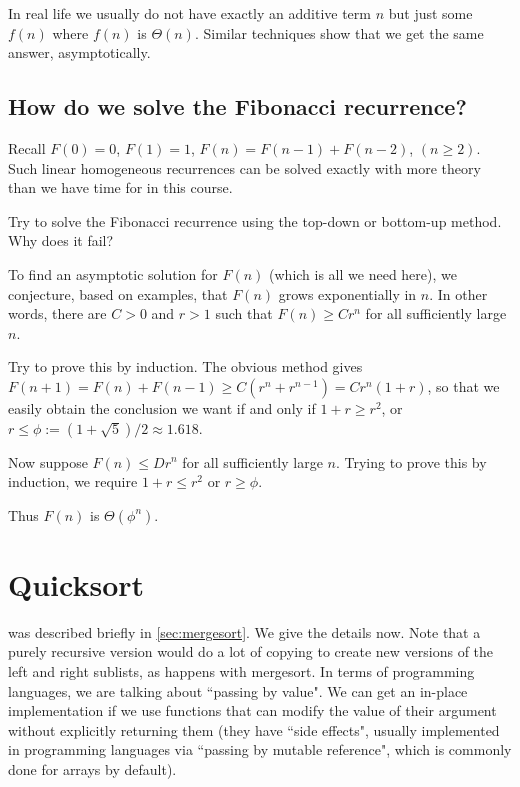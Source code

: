 In real life we usually do not have exactly an additive term $n$
but just some $f(n)$ where $f(n)$ is $\Theta(n)$. Similar techniques show that 
we get the same answer, asymptotically. 


\section{How do we solve the Fibonacci recurrence?}
Recall $F(0) = 0$, $F(1) = 1$, $F(n) = F(n-1) + F(n-2)$,  $(n \geq 2)$.
Such linear homogeneous recurrences can be solved exactly with
more theory than we have time for in this course. 

\begin{Boxample}[3]
Try to solve the Fibonacci recurrence using the top-down or bottom-up method. Why does it fail?

\end{Boxample}

To find an asymptotic solution for $F(n)$ (which is all we need here), we conjecture, based on examples, 
that $F(n)$ grows exponentially in $n$. 
In other words, there are $C > 0$ and $r > 1$ such that 
$F(n) \geq C r^n$ for all sufficiently large $n$.

Try to prove this by induction. The obvious method gives 
$F(n+1) = F(n) + F(n-1) \geq C(r^n + r^{n-1}) = Cr^{n}(1+r)$, so that we easily obtain
the conclusion we want if and only if $1 + r \geq r^2$, or $r \leq
\phi:= (1 + \sqrt{5})/2 \approx 1.618$. 

Now suppose $F(n) \leq D r^n$ for all sufficiently large $n$. 
Trying to prove this by induction, we require $1 + r \leq r^2$ or $r \geq \phi$. 

Thus $F(n)$ is $\Theta(\phi^n)$.


\chapter{Quicksort} %
\label{sec:quicksort}

 was described briefly in \cref{sec:mergesort}. We give the details now. Note that a purely recursive version would do a lot of copying to 
create new versions of the left and right sublists, as happens with mergesort. In terms of programming languages, we are talking about ``passing by value". 
We can get an in-place implementation if we use functions that can modify the value of their argument without explicitly returning them 
(they have ``side effects", usually implemented in programming languages via ``passing by mutable reference", which is commonly done for arrays by default).

